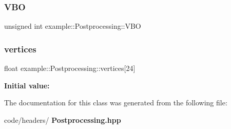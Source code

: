 \mbox{\label{classexample_1_1_postprocessing_af6d10be91780f384d5993481cb9b2e2b}} 
\subsubsection{VBO}
{\footnotesize\ttfamily unsigned int example\+::\+Postprocessing\+::\+V\+BO}

\mbox{\label{classexample_1_1_postprocessing_a420ba451a736eaaeab2a98b70755130b}} 
\subsubsection{vertices}
{\footnotesize\ttfamily float example\+::\+Postprocessing\+::vertices[24]}

{\bfseries Initial value\+:}
\begin{DoxyCode}{0}
\DoxyCodeLine{= \{ }
\DoxyCodeLine{}
\DoxyCodeLine{}
\DoxyCodeLine{        \}}

\end{DoxyCode}


The documentation for this class was generated from the following file\+:\begin{DoxyCompactItemize}
\item 
code/headers/\textbf{ Postprocessing.\+hpp}\end{DoxyCompactItemize}
